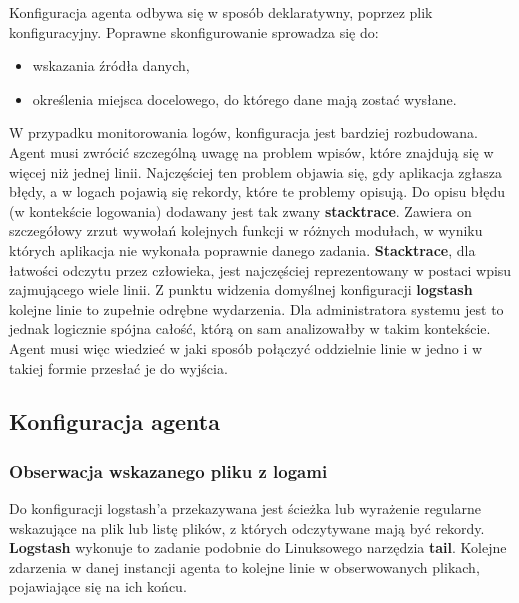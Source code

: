     Konfiguracja agenta odbywa się w sposób deklaratywny, poprzez plik konfiguracyjny. Poprawne
    skonfigurowanie sprowadza się do:
    \begin{itemize}
        \item wskazania źródła danych,
        \item określenia miejsca docelowego, do którego dane mają zostać wysłane.
    \end{itemize}
    W przypadku monitorowania logów, konfiguracja jest bardziej rozbudowana.
    Agent musi zwrócić szczególną uwagę na problem wpisów, które znajdują się w więcej niż jednej linii.
    Najczęściej ten problem objawia się, gdy aplikacja zgłasza błędy, a w logach pojawią się rekordy, które
    te problemy opisują. Do opisu błędu (w kontekście logowania) dodawany jest tak zwany \textbf{stacktrace}.
    Zawiera on szczegółowy zrzut wywołań kolejnych funkcji w różnych modułach, w wyniku których aplikacja
    nie wykonała poprawnie danego zadania. \textbf{Stacktrace}, dla łatwości odczytu przez człowieka,
    jest najczęściej reprezentowany w postaci wpisu zajmującego wiele linii. Z punktu widzenia domyślnej
    konfiguracji \textbf{logstash} kolejne linie to zupełnie odrębne wydarzenia. Dla administratora systemu jest
    to jednak logicznie spójna całość, którą on sam analizowałby w takim kontekście. Agent musi więc wiedzieć
    w jaki sposób połączyć oddzielnie linie w jedno i w takiej formie przesłać je do wyjścia.
    
    \subsection{Konfiguracja agenta}
        \label{chapter:monasca:monasca_log_agent:configuration}
        
        \subsubsection{Obserwacja wskazanego pliku z logami}
            Do konfiguracji logstash'a przekazywana jest ścieżka lub wyrażenie regularne wskazujące
            na plik lub listę plików, z których odczytywane mają być rekordy. \textbf{Logstash}
            wykonuje to zadanie podobnie do Linuksowego narzędzia \textbf{tail}. Kolejne zdarzenia w danej 
            instancji agenta to kolejne linie w obserwowanych plikach, pojawiające się na ich końcu. 
        
